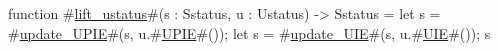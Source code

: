 function #\hyperref[sailRISCVzliftzyustatus]{lift\_ustatus}#(s : Sstatus, u : Ustatus) -> Sstatus = {
  let s = #\hyperref[sailRISCVzupdatezyUPIE]{update\_UPIE}#(s, u.#\hyperref[sailRISCVzUPIE]{UPIE}#());
  let s = #\hyperref[sailRISCVzupdatezyUIE]{update\_UIE}#(s, u.#\hyperref[sailRISCVzUIE]{UIE}#());
  s
}
